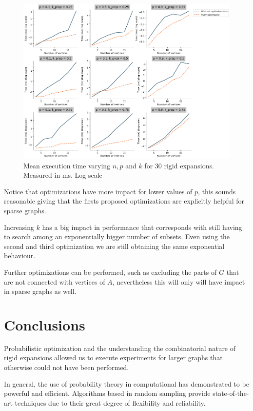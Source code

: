 \begin{figure}[h!]
	\centering
	\includegraphics[scale=0.45]{Python/Figures/Time-execution-rigid-expansions-log-scale.png}
	\caption{Mean execution time varying $n, p$ and $k$ for 30 rigid expansions. Measured in ms. Log scale }
	\label{fig:executionTimesRigidExpansionLog}
\end{figure}

Notice that optimizations have more impact for lower values of $p$, this sounds reasonable giving that the firsts proposed optimizations are explicitly helpful for sparse graphs. 

Increasing $k$ has a big impact in performance that corresponds with still having to search among an exponentially bigger number of subsets. Even using the second and third optimization we are still obtaining the same exponential behaviour.

Further optimizations can be performed, such as excluding the parts of $G$ that are not connected with vertices of $A$, nevertheless this will only will have impact in sparse graphs as well.

\section{Conclusions}

Probabilistic optimization and the understanding the combinatorial nature of rigid expansions allowed us to execute experiments for larger graphs that otherwise could not have been performed.

In general, the use of probability theory in computational has demonstrated to be powerful and efficient. Algorithms based in random sampling provide state-of-the-art techniques due to their great degree of flexibility and reliability. 


